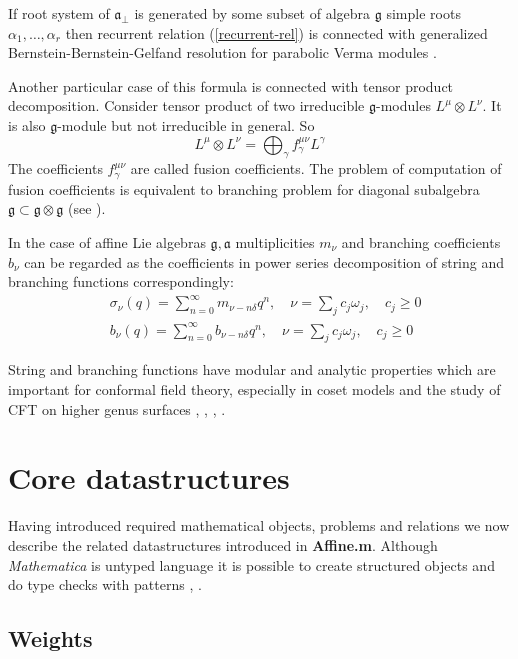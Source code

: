 \documentclass[preprint,12pt]{elsarticle}
\newcommand{\gf}{\mathfrak{g}}
\newcommand{\af}{\mathfrak{a}}
\newcommand{\afb}{\mathfrak{a}_{\bot}}
\begin{document}
If root system of $\afb$ is generated by some subset of algebra $\gf$ simple roots $\alpha_{1},\dots,\alpha_{r}$ then recurrent relation (\ref{recurrent-rel}) is connected with generalized Bernstein-Bernstein-Gelfand resolution for parabolic Verma modules \cite{2011arXiv1102.1702L}.

Another particular case of this formula is connected with tensor product decomposition. Consider tensor product of two irreducible $\gf$-modules $L^{\mu}\otimes L^{\nu}$. It is also $\gf$-module but not irreducible in general. So
\begin{equation}
  \label{eq:19}
  L^{\mu}\otimes L^{\nu}=\bigoplus_{\gamma} f^{\mu\nu}_{\gamma}L^{\gamma}
\end{equation}
The coefficients $f^{\mu\nu}_{\gamma}$ are called fusion coefficients. The problem of computation of fusion coefficients is equivalent to branching problem for diagonal subalgebra $\gf\subset \gf\otimes \gf$ (see \cite{LyakhovskyPostnova2011}).

In the case of affine Lie algebras $\gf, \af$  multiplicities $m_{\nu}$ and branching coefficients $b_{\nu}$ can be regarded as the coefficients in power series decomposition of string and branching functions correspondingly:
\begin{align}
  \label{eq:21}
  &\sigma_{\nu}(q)=\sum_{n=0}^{\infty} m_{\nu-n\delta} q^n, \quad \nu=\sum_j c_j \omega_j,\quad c_j\geq 0\\
  & b_{\nu}(q)=\sum_{n=0}^{\infty} b_{\nu-n\delta} q^n,\quad  \nu=\sum_j c_j \omega_j, \quad c_j\geq 0
\end{align}

String and branching functions have  modular and analytic properties which are important for conformal field theory, especially in  coset models and the study of CFT on higher genus surfaces \cite{kac1988modular}, \cite{difrancesco1997cft}, \cite{Walton:1999xc}, \cite{walton1989conformal}. 

\section{Core datastructures}
\label{sec:core-datastructures}
Having introduced required mathematical objects, problems and relations we now describe the related datastructures introduced in {\bf Affine.m}. 
Although {\it Mathematica} is untyped language it is possible to create structured objects and do type checks with patterns \cite{shifrinmathematica}, \cite{maeder2000computer}. 
\subsection{Weights}
\label{sec:weights}
\end{document}
